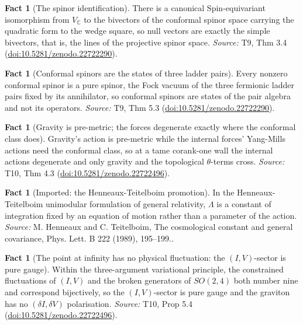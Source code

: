 \documentclass[11pt]{article}
\theoremstyle{definition}
\newtheorem{fact}[theorem]{Fact}
\theoremstyle{plain}
\newcommand{\changedmark}[2]{\marginpar{\raggedright\scriptsize\color{#1}#2}}
\providecommand{\C}{}\renewcommand{\C}{\mathbb{C}}
\providecommand{\Spin}{}\renewcommand{\Spin}{\mathrm{Spin}}
\begin{document}
\begin{fact}[The spinor identification]\label{c:correspondence.spinor-identification}
There is a canonical $\Spin$-equivariant isomorphism from $V_\C$ to the bivectors of the conformal spinor space carrying the quadratic form to the wedge square, so null vectors are exactly the simple bivectors, that is, the lines of the projective spinor space.
\emph{Source:} T9, Thm 3.4 (\href{https://doi.org/10.5281/zenodo.22722290}{doi:10.5281/zenodo.22722290}).
\end{fact}

\begin{fact}[Conformal spinors are the states of three ladder pairs]\label{c:correspondence.twistors-are-states-three-ladder-pairs}
Every nonzero conformal spinor is a pure spinor, the Fock vacuum of the three fermionic ladder pairs fixed by its annihilator, so conformal spinors are states of the pair algebra and not its operators.
\emph{Source:} T9, Thm 5.3 (\href{https://doi.org/10.5281/zenodo.22722290}{doi:10.5281/zenodo.22722290}).
\end{fact}

\begin{fact}[Gravity is pre-metric; the forces degenerate exactly where the conformal class does]\label{c:dark-energy.gravity-pre-metric-forces-degenerate-exactly}
\changedmark{gray}{reworded}
Gravity's action is pre-metric while the internal forces' Yang-Mills actions need the conformal class, so at a tame corank-one wall the internal actions degenerate and only gravity and the topological $\theta$-terms cross.
\emph{Source:} T10, Thm 4.3 (\href{https://doi.org/10.5281/zenodo.22722496}{doi:10.5281/zenodo.22722496}).
\end{fact}

\begin{fact}[Imported: the Henneaux-Teitelboim promotion]\label{c:dark-energy.imported-henneaux-teitelboim-promotion}
In the Henneaux-Teitelboim unimodular formulation of general relativity, $\Lambda$ is a constant of integration fixed by an equation of motion rather than a parameter of the action.
\emph{Source:} M. Henneaux and C. Teitelboim, The cosmological constant and general covariance, Phys. Lett. B 222 (1989), 195--199..
\end{fact}

\begin{fact}[The point at infinity has no physical fluctuation: the $(I,V)$-sector is pure gauge]\label{c:dark-energy.point-infinity-has-no-physical-fluctuation}
Within the three-argument variational principle, the constrained fluctuations of $(I,V)$ and the broken generators of $SO(2,4)$ both number nine and correspond bijectively, so the $(I,V)$-sector is pure gauge and the graviton has no $(\delta I,\delta V)$ polarisation.
\emph{Source:} T10, Prop 5.4 (\href{https://doi.org/10.5281/zenodo.22722496}{doi:10.5281/zenodo.22722496}).
\end{fact}
\end{document}
